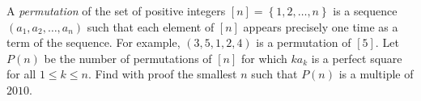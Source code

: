 A \emph{permutation} of the set of positive integers $\left[n\right]=\left\{1,2,\ldots,n\right\}$ is a sequence $\left(a_1,a_2,\ldots,a_n\right)$ such that each element of $\left[n\right]$ appears precisely one time as a term of the sequence. For example, $\left(3,5,1,2,4\right)$ is a permutation of $\left[5\right]$. Let $P\left(n\right)$ be the number of permutations of $\left[n\right]$ for which $ka_k$ is a perfect square for all $1\leq k\leq n$. Find with proof the smallest $n$ such that $P\left(n\right)$ is a multiple of $2010$.